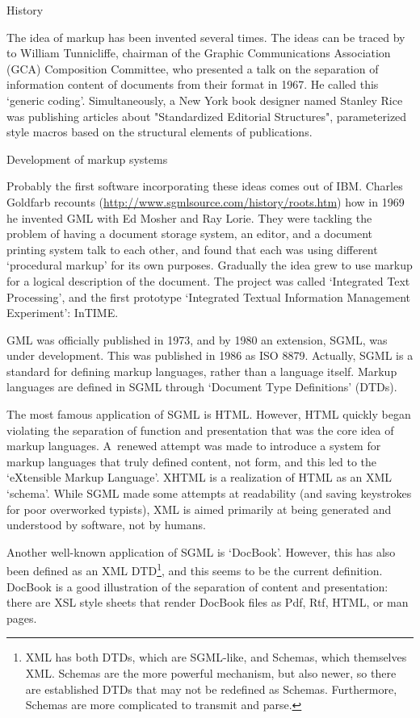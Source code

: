  {History}

The idea of markup has been invented several times. The ideas can be
traced by to William
Tunnicliffe, chairman of the Graphic Communications Association (GCA)
Composition Committee, who presented a talk on the separation of
information content of documents from their format in 1967.
He called this `generic coding'.
Simultaneously, a New York book designer named Stanley
Rice was publishing articles about "Standardized Editorial
Structures", parameterized style macros based on the structural
elements of publications.

 {Development of markup systems}

Probably the first software incorporating these ideas comes out of
IBM. Charles Goldfarb recounts
(\url{http://www.sgmlsource.com/history/roots.htm}) how in 1969 he
invented GML with Ed Mosher and Ray Lorie. They were
tackling the problem of having a document storage system, an editor,
and a document printing system talk to each other, and found that each
was using different `procedural markup' for
its own purposes. Gradually the idea grew to use markup for a logical
description of the document. The project was called `Integrated Text
Processing', and the first prototype `Integrated Textual Information
Management Experiment': InTIME.

GML was officially published in 1973, and by 1980 an extension,
SGML, was under development. This was published in 1986 as
ISO 8879. Actually, SGML is a standard for defining markup languages,
rather than a language itself. Markup languages are defined in SGML
through `Document Type Definitions' (DTDs). 

The most famous application of SGML is HTML. However, HTML
quickly began violating the separation of function and presentation
that was the core idea of markup languages. A~renewed attempt was made
to introduce a system for markup languages that truly defined content,
not form, and this led to the `eXtensible Markup
Language'. XHTML is a realization of HTML as an XML
`schema'. While SGML made some attempts at readability
(and saving keystrokes for poor overworked typists), XML is aimed
primarily at being generated and understood by software, not by
humans.

Another well-known application of SGML is
`DocBook'. However, this has also been defined as an
XML DTD\footnote{XML has both DTDs, which are SGML-like, and Schemas,
  which themselves XML. Schemas are the more powerful mechanism, but
  also newer, so there are established DTDs that may not be redefined
  as Schemas. Furthermore, Schemas are more complicated to transmit
  and parse.}, and this seems to be the current definition. DocBook is
a good illustration of the separation of content and presentation:
there are XSL style sheets that render DocBook files as Pdf, Rtf,
HTML, or man pages.

